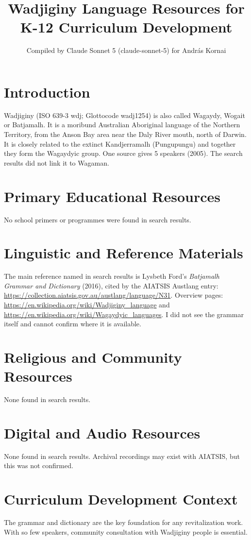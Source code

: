 \documentclass[12pt]{article}
\title{Wadjiginy Language Resources for K-12 Curriculum Development}
\author{Compiled by Claude Sonnet 5 (claude-sonnet-5) for Andr\'as Kornai}
\date{}
\begin{document}
\maketitle

\section{Introduction}
Wadjiginy (ISO 639-3 wdj; Glottocode wadj1254) is also called Wagaydy, Wogait or Batjamalh. It is a moribund Australian Aboriginal language of the Northern Territory, from the Anson Bay area near the Daly River mouth, north of Darwin. It is closely related to the extinct Kandjerramalh (Pungupungu) and together they form the Wagaydyic group. One source gives 5 speakers (2005). The search results did not link it to Wagaman.

\section{Primary Educational Resources}
No school primers or programmes were found in search results.

\section{Linguistic and Reference Materials}
The main reference named in search results is Lysbeth Ford's \emph{Batjamalh Grammar and Dictionary} (2016), cited by the AIATSIS Austlang entry: \url{https://collection.aiatsis.gov.au/austlang/language/N31}. Overview pages: \url{https://en.wikipedia.org/wiki/Wadjiginy_language} and \url{https://en.wikipedia.org/wiki/Wagaydyic_languages}. I did not see the grammar itself and cannot confirm where it is available.

\section{Religious and Community Resources}
None found in search results.

\section{Digital and Audio Resources}
None found in search results. Archival recordings may exist with AIATSIS, but this was not confirmed.

\section{Curriculum Development Context}
The grammar and dictionary are the key foundation for any revitalization work. With so few speakers, community consultation with Wadjiginy people is essential.
\end{document}
